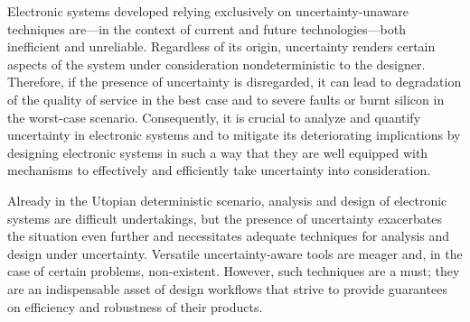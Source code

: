 Electronic systems developed relying exclusively on uncertainty-unaware
techniques are---in the context of current and future technologies---both
inefficient and unreliable. Regardless of its origin, uncertainty renders
certain aspects of the system under consideration nondeterministic to the
designer. Therefore, if the presence of uncertainty is disregarded, it can lead
to degradation of the quality of service in the best case and to severe faults
or burnt silicon in the worst-case scenario. Consequently, it is crucial to
analyze and quantify uncertainty in electronic systems and to mitigate its
deteriorating implications by designing electronic systems in such a way that
they are well equipped with mechanisms to effectively and efficiently take
uncertainty into consideration.

Already in the Utopian deterministic scenario, analysis and design of electronic
systems are difficult undertakings, but the presence of uncertainty exacerbates
the situation even further and necessitates adequate techniques for analysis and
design under uncertainty. Versatile uncertainty-aware tools are meager and, in
the case of certain problems, non-existent. However, such techniques are a must;
they are an indispensable asset of design workflows that strive to provide
guarantees on efficiency and robustness of their products.
